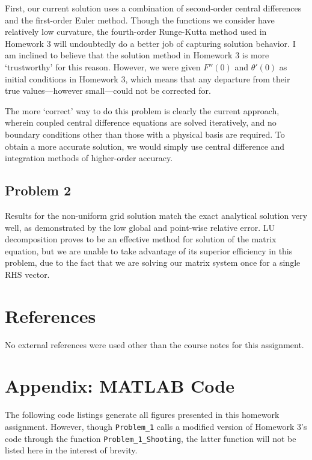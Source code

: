 \documentclass[11pt]{article}
\begin{document}
First, our current solution uses a combination of second-order central differences and the first-order Euler method. Though the functions we consider have relatively low curvature, the fourth-order Runge-Kutta method used in Homework 3 will undoubtedly do a better job of capturing solution behavior. I am inclined to believe that the solution method in Homework 3 is more `trustworthy' for this reason. However, we were given $F''(0)$ and $\theta'(0)$ as initial conditions in Homework 3, which means that any departure from their true values---however small---could not be corrected for.

The more `correct' way to do this problem is clearly the current approach, wherein coupled central difference equations are solved iteratively, and no boundary conditions other than those with a physical basis are required. To obtain a more accurate solution, we would simply use central difference and integration methods of higher-order accuracy.

\subsection{Problem 2}

Results for the non-uniform grid solution match the exact analytical solution very well, as demonstrated by the low global and point-wise relative error. LU decomposition proves to be an effective method for solution of the matrix equation, but we are unable to take advantage of its superior efficiency in this problem, due to the fact that we are solving our matrix system once for a single RHS vector.

\section{References} %

No external references were used other than the course notes for this assignment.

\section*{Appendix: MATLAB Code} %

The following code listings generate all figures presented in this homework assignment. However, though \lstinline|Problem_1| calls a modified version of Homework 3's code through the function \lstinline|Problem_1_Shooting|, the latter function will not be listed here in the interest of brevity.


\end{document}
